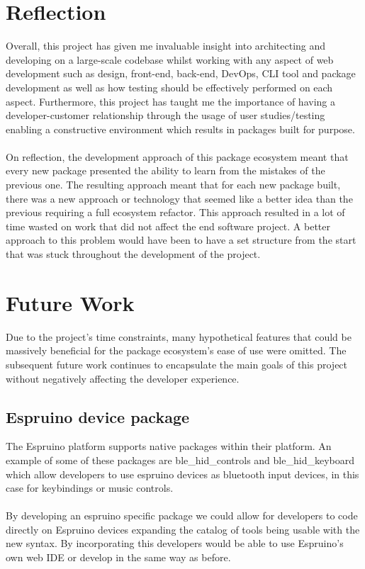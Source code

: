 \documentclass{l4proj}
\begin{document}
\section{Reflection}

Overall, this project has given me invaluable insight into architecting and developing on a large-scale codebase whilst working with any aspect of web development such as design, front-end, back-end, DevOps, CLI tool and package development as well as how testing should be effectively performed on each aspect. Furthermore, this project has taught me the importance of having a developer-customer relationship through the usage of user studies/testing enabling a constructive environment which results in packages built for purpose.
\\ \\
On reflection, the development approach of this package ecosystem meant that every new package presented the ability to learn from the mistakes of the previous one. The resulting approach meant that for each new package built, there was a new approach or technology that seemed like a better idea than the previous requiring a full ecosystem refactor. This approach resulted in a lot of time wasted on work that did not affect the end software project. A better approach to this problem would have been to have a set structure from the start that was stuck throughout the development of the project.

\section{Future Work}
Due to the project's time constraints, many hypothetical features that could be massively beneficial for the package ecosystem's ease of use were omitted. The subsequent future work continues to encapsulate the main goals of this project without negatively affecting the developer experience.
\subsection{Espruino device package}

The Espruino platform supports native packages within their platform. An example of some of these packages are ble\_hid\_controls and ble\_hid\_keyboard which allow developers to use espruino devices as bluetooth input devices, in this case for keybindings or music controls.
\\ \\
By developing an espruino specific package we could allow for developers to code directly on Espruino devices expanding the catalog of tools being usable with the new syntax. By incorporating this developers would be able to use Espruino's own web IDE or develop in the same way as before.
\end{document}
